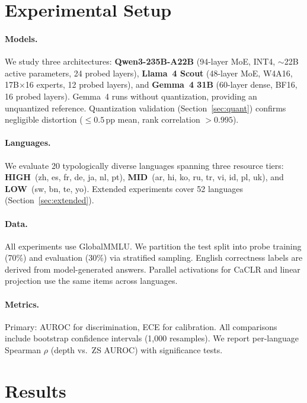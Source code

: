 \documentclass[11pt,a4paper]{article}
\newcommand{\pp}{\,\text{pp}}
\newcommand{\caclr}{CaCLR}
\begin{document}
\section{Experimental Setup}

\paragraph{Models.}
We study three architectures: \textbf{Qwen3-235B-A22B} (94-layer MoE, INT4, ${\sim}$22B active parameters, 24 probed layers), \textbf{Llama~4 Scout} (48-layer MoE, W4A16, 17B$\times$16 experts, 12 probed layers), and \textbf{Gemma~4 31B} (60-layer dense, BF16, 16 probed layers).
Gemma~4 runs without quantization, providing an unquantized reference.
Quantization validation (Section~\ref{sec:quant}) confirms negligible distortion (${\leq}0.5\pp$ mean, rank correlation ${>}0.995$).

\paragraph{Languages.}
We evaluate 20 typologically diverse languages spanning three resource tiers: \textbf{HIGH}~(zh, es, fr, de, ja, nl, pt), \textbf{MID}~(ar, hi, ko, ru, tr, vi, id, pl, uk), and \textbf{LOW}~(sw, bn, te, yo).
Extended experiments cover 52 languages (Section~\ref{sec:extended}).

\paragraph{Data.}
All experiments use GlobalMMLU.
We partition the test split into probe training (70\%) and evaluation (30\%) via stratified sampling.
English correctness labels are derived from model-generated answers.
Parallel activations for \caclr{} and linear projection use the same items across languages.

\paragraph{Metrics.}
Primary: AUROC for discrimination, ECE for calibration.
All comparisons include bootstrap confidence intervals (1,000 resamples).
We report per-language Spearman $\rho$ (depth vs.\ ZS AUROC) with significance tests.


\section{Results}
\end{document}
